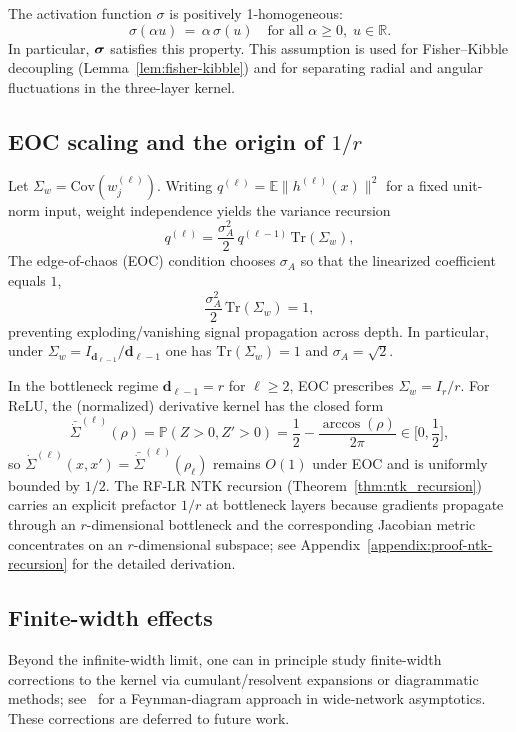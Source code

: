 \begin{assumption}\label{assump:homogeneous_activation}
The activation function \( \sigma \) is positively 1-homogeneous:
\[
\sigma(\alpha u) \,=\, \alpha\,\sigma(u)\quad\text{for all } \alpha\ge 0,\; u\in\mathbb{R}.
\]
In particular, \(\mathrel{\boldsymbol{\sigma}}\) satisfies this property. This assumption is used for Fisher--Kibble decoupling (Lemma~\ref{lem:fisher-kibble}) and for separating radial and angular fluctuations in the three-layer kernel.
\end{assumption}

\subsection{\texorpdfstring{EOC scaling and the origin of \(1/r\)}{EOC scaling and the origin of 1/r}}\label{appendix:eoc-scaling}
Let \(\Sigma_w=\mathrm{Cov}(w^{(\ell)}_j)\). Writing \(q^{(\ell)}=\mathbb{E}\|h^{(\ell)}(x)\|^2\) for a fixed unit-norm input, weight independence yields the variance recursion
\[
q^{(\ell)}=\frac{\sigma_A^2}{2}\,q^{(\ell-1)}\,\mathrm{Tr}(\Sigma_w),
\]
The edge-of-chaos (EOC) condition chooses \(\sigma_A\) so that the linearized coefficient equals \(1\),
\[
\frac{\sigma_A^2}{2}\,\mathrm{Tr}(\Sigma_w)=1,
\]
preventing exploding/vanishing signal propagation across depth. In particular, under \(\Sigma_w=I_{\bm{d}_{\ell-1}}/\bm{d}_{\ell-1}\) one has \(\mathrm{Tr}(\Sigma_w)=1\) and \(\sigma_A=\sqrt{2}\).

In the bottleneck regime \(\bm{d}_{\ell-1}=r\) for \(\ell\ge 2\), EOC prescribes \(\Sigma_w=I_r/r\). For ReLU, the (normalized) derivative kernel has the closed form
\[
\bar{\dot{\Sigma}}^{(\ell)}(\rho)=\mathbb{P}(Z>0,Z'>0)=\frac{1}{2}-\frac{\arccos(\rho)}{2\pi}\in\Big[0,\frac12\Big],
\]
so \(\dot{\Sigma}^{(\ell)}(x,x')=\bar{\dot{\Sigma}}^{(\ell)}(\rho_\ell)\) remains \(O(1)\) under EOC and is uniformly bounded by \(1/2\).
The RF-LR NTK recursion (Theorem~\ref{thm:ntk_recursion}) carries an explicit prefactor \(1/r\) at bottleneck layers because gradients propagate through an \(r\)-dimensional bottleneck and the corresponding Jacobian metric concentrates on an \(r\)-dimensional subspace; see Appendix~\ref{appendix:proof-ntk-recursion} for the detailed derivation.

\subsection{Finite-width effects}\label{appendix:finite-width-effects}
Beyond the infinite-width limit, one can in principle study finite-width corrections to the kernel via cumulant/resolvent expansions or diagrammatic methods; see~\cite{dyer2019asymptoticswidenetworksfeynman} for a Feynman-diagram approach in wide-network asymptotics. These corrections are deferred to future work.

